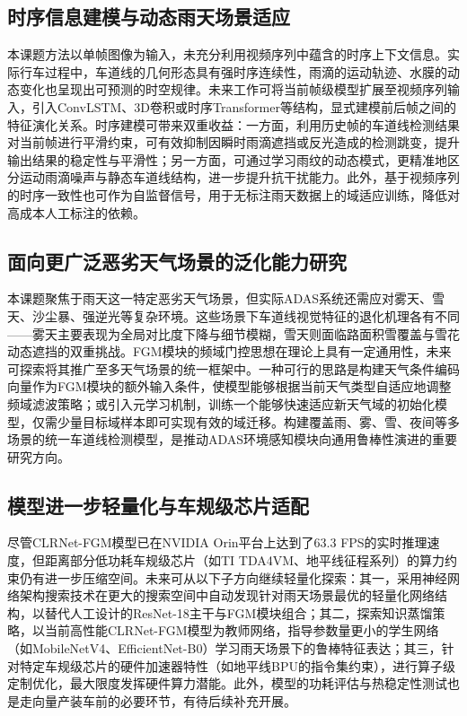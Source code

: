 \subsection{时序信息建模与动态雨天场景适应}

本课题方法以单帧图像为输入，未充分利用视频序列中蕴含的时序上下文信息。实际行车过程中，车道线的几何形态具有强时序连续性，雨滴的运动轨迹、水膜的动态变化也呈现出可预测的时空规律。未来工作可将当前帧级模型扩展至视频序列输入，引入ConvLSTM、3D卷积或时序Transformer等结构，显式建模前后帧之间的特征演化关系。时序建模可带来双重收益：一方面，利用历史帧的车道线检测结果对当前帧进行平滑约束，可有效抑制因瞬时雨滴遮挡或反光造成的检测跳变，提升输出结果的稳定性与平滑性；另一方面，可通过学习雨纹的动态模式，更精准地区分运动雨滴噪声与静态车道线结构，进一步提升抗干扰能力。此外，基于视频序列的时序一致性也可作为自监督信号，用于无标注雨天数据上的域适应训练，降低对高成本人工标注的依赖。

\subsection{面向更广泛恶劣天气场景的泛化能力研究}

本课题聚焦于雨天这一特定恶劣天气场景，但实际ADAS系统还需应对雾天、雪天、沙尘暴、强逆光等复杂环境。这些场景下车道线视觉特征的退化机理各有不同——雾天主要表现为全局对比度下降与细节模糊，雪天则面临路面积雪覆盖与雪花动态遮挡的双重挑战。FGM模块的频域门控思想在理论上具有一定通用性，未来可探索将其推广至多天气场景的统一框架中。一种可行的思路是构建天气条件编码向量作为FGM模块的额外输入条件，使模型能够根据当前天气类型自适应地调整频域滤波策略；或引入元学习机制，训练一个能够快速适应新天气域的初始化模型，仅需少量目标域样本即可实现有效的域迁移。构建覆盖雨、雾、雪、夜间等多场景的统一车道线检测模型，是推动ADAS环境感知模块向通用鲁棒性演进的重要研究方向。

\subsection{模型进一步轻量化与车规级芯片适配}

尽管CLRNet-FGM模型已在NVIDIA Orin平台上达到了63.3 FPS的实时推理速度，但距离部分低功耗车规级芯片（如TI TDA4VM、地平线征程系列）的算力约束仍有进一步压缩空间。未来可从以下子方向继续轻量化探索：其一，采用神经网络架构搜索技术在更大的搜索空间中自动发现针对雨天场景最优的轻量化网络结构，以替代人工设计的ResNet-18主干与FGM模块组合；其二，探索知识蒸馏策略，以当前高性能CLRNet-FGM模型为教师网络，指导参数量更小的学生网络（如MobileNetV4、EfficientNet-B0）学习雨天场景下的鲁棒特征表达；其三，针对特定车规级芯片的硬件加速器特性（如地平线BPU的指令集约束），进行算子级定制优化，最大限度发挥硬件算力潜能。此外，模型的功耗评估与热稳定性测试也是走向量产装车前的必要环节，有待后续补充开展。

